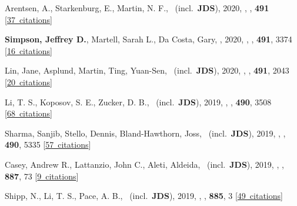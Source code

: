 \item[{\color{numcolor}\scriptsize39}] Arentsen, A., Starkenburg, E., Martin, N. F., \etal\ (incl.\ \textbf{JDS}), 2020, , \mnras, \textbf{491} [\href{https://ui.adsabs.harvard.edu/#abs/2020MNRAS.491L..11A}{37~citations}]

\item[{\color{numcolor}\scriptsize38}] \textbf{Simpson, Jeffrey D.}, Martell, Sarah L., Da Costa, Gary, \etal, 2020, , \mnras, \textbf{491}, 3374 [\href{https://ui.adsabs.harvard.edu/#abs/2020MNRAS.491.3374S}{16~citations}]

\item[{\color{numcolor}\scriptsize37}] Lin, Jane, Asplund, Martin, Ting, Yuan-Sen, \etal\ (incl.\ \textbf{JDS}), 2020, , \mnras, \textbf{491}, 2043 [\href{https://ui.adsabs.harvard.edu/#abs/2020MNRAS.491.2043L}{20~citations}]

\item[{\color{numcolor}\scriptsize36}] Li, T. S., Koposov, S. E., Zucker, D. B., \etal\ (incl.\ \textbf{JDS}), 2019, , \mnras, \textbf{490}, 3508 [\href{https://ui.adsabs.harvard.edu/#abs/2019MNRAS.490.3508L}{68~citations}]

\item[{\color{numcolor}\scriptsize35}] Sharma, Sanjib, Stello, Dennis, Bland-Hawthorn, Joss, \etal\ (incl.\ \textbf{JDS}), 2019, , \mnras, \textbf{490}, 5335 [\href{https://ui.adsabs.harvard.edu/#abs/2019MNRAS.490.5335S}{57~citations}]

\item[{\color{numcolor}\scriptsize34}] Casey, Andrew R., Lattanzio, John C., Aleti, Aldeida, \etal\ (incl.\ \textbf{JDS}), 2019, , \apj, \textbf{887}, 73 [\href{https://ui.adsabs.harvard.edu/#abs/2019ApJ...887...73C}{9~citations}]

\item[{\color{numcolor}\scriptsize33}] Shipp, N., Li, T. S., Pace, A. B., \etal\ (incl.\ \textbf{JDS}), 2019, , \apj, \textbf{885}, 3 [\href{https://ui.adsabs.harvard.edu/#abs/2019ApJ...885....3S}{49~citations}]

